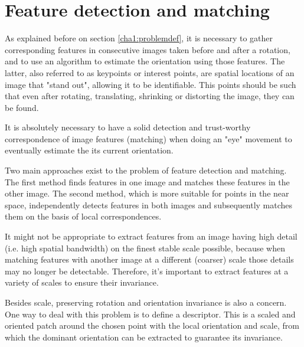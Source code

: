 
\section{Feature detection and matching}
\label{cha2:features}

As explained before on section \ref{cha1:problemdef}, it is necessary to gather corresponding features in consecutive images taken before and after a rotation, and to use an algorithm to estimate the orientation using those features. The latter, also referred to as keypoints or interest points, are spatial locations of an image that "stand out", allowing it to be identifiable. This points should be such that even after rotating, translating, shrinking or distorting the image, they can be found.

It is absolutely necessary to have a solid detection and trust-worthy correspondence of image features (matching) when doing an "eye" movement to eventually estimate the its current orientation.

Two main approaches exist to the problem of feature detection and matching. The first method finds features in one image and matches these features in the other image. The second method, which is more suitable for points in the near space, independently detects features in both images and subsequently matches them on the basis of local correspondences.

It might not be appropriate to extract features from an image having high detail (i.e. high spatial bandwidth) on the finest stable scale possible, because when matching features with another image at a different (coarser) scale those details may no longer be detectable. Therefore, it's important to extract features at a variety of scales to ensure their invariance. 

Besides scale, preserving rotation and orientation invariance is also a concern. One way to deal with this problem is to define a descriptor. This is a scaled and oriented patch around the chosen point with the local orientation and scale, from which the dominant orientation can be extracted to guarantee its invariance. \cite{multiview}

